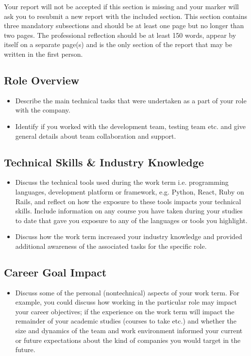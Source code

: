 \begin{Professional Reflection}
	Your report will not be accepted if this section is missing and your marker will ask you to resubmit a new report with the included section. This section contains three mandatory subsections and should be at least one page but no longer than two pages. The professional reflection should be at least 150 words, appear by itself on a separate page(s) and is the only section of the report that may be written in the first person.

	\subsection{Role Overview}
		\begin{itemize}
			\item Describe the main technical tasks that were undertaken as a part of your role with the
company.
			\item Identify if you worked with the development team, testing team etc. and give general details
about team collaboration and support.
		\end{itemize}
		
	\subsection{Technical Skills \& Industry Knowledge}
		\begin{itemize}
			\item Discuss the technical tools used during the work term i.e. programming languages, development platform or framework, e.g. Python, React, Ruby on Rails, and reflect on how the exposure to these tools impacts your technical skills. Include information on any course you have taken during your studies to date that gave you exposure to any of the languages or tools you highlight.
			\item Discuss how the work term increased your industry knowledge and provided additional awareness of the associated tasks for the specific role.
		\end{itemize}
	
	\subsection{Career Goal Impact}
		\begin{itemize}
			\item Discuss some of the personal (nontechnical) aspects of your work term. For example, you could discuss how working in the particular role may impact your career objectives; if the experience on the work term will impact the remainder of your academic studies (courses to take etc.) and whether the size and dynamics of the team and work environment informed your current or future expectations about the kind of companies you would target in the future.
		\end{itemize}
\end{Professional Reflection}
